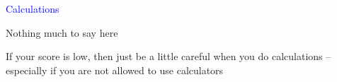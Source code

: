 \documentclass[14pt,fleqn]{extarticle}
\begin{document}
\begin{skill}
    \begin{narrow}
\textcolor{blue}{Calculations}
    \end{narrow}
    
    \reason 

Nothing much to say here \newline 

If your score is low, then just be a little careful when you do calculations -- especially if you are not allowed to use calculators
    
\end{skill}
\end{document}
